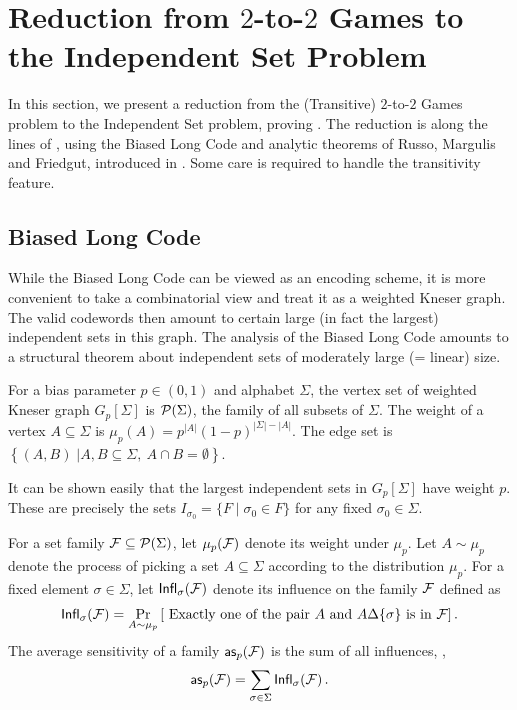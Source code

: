 \documentclass{toc}
\newcommand\card[1]{\left| {#1} \right|}
\newcommand\sett[2]{\left\{ \left. #1 \;\right\vert #2 \right\}}
\newcommand\Prob[2]{{\Pr_{#1}\left[ {#2} \right]}}
\begin{document}
\section{Reduction from \texorpdfstring{$2$-to-$2$}{2-to-2} Games
to the Independent Set Problem}\label{sec:vc-is}

In this section, we present a reduction from the (Transitive) $2$-to-$2$ Games problem to the Independent Set problem, proving
.
The reduction is along the lines of \cite{DS05, Khot02, KR08}, using the Biased Long Code
and analytic theorems of Russo, Margulis and Friedgut, introduced in \cite{DS05}. Some care is required to handle the
transitivity feature.


\subsection{Biased Long Code}\label{appendix:blc}
While the Biased Long Code can be viewed as an encoding scheme, it is more convenient to take a combinatorial
view and treat it as a weighted Kneser graph. The valid codewords then amount to certain large (in fact the largest) independent sets
in this graph. The analysis of the Biased Long Code amounts to a structural theorem about independent sets of
moderately large (= linear) size.


\begin{definition} For a bias parameter $p \in (0, 1)$ and alphabet $\Sigma$,
the vertex set of weighted Kneser graph  $G_p[\Sigma]$ is ${\cal P}(\Sigma)$, the family of all subsets of $\Sigma$.
The weight of a vertex $A \subseteq \Sigma$ is $\mu_p(A)=p^{\card{A}}(1-p)^{|\Sigma|-\card{A}}$.
The edge set is $\sett{(A,B)}{A, B \subseteq\Sigma, ~A\cap B=\emptyset}$.
\end{definition}

It can be shown easily that the largest independent sets in $G_p[\Sigma]$ have weight $p$. These are precisely
the sets $I_{\sigma_0} = \{ F \mid \sigma_0 \in F \}$ for any fixed $\sigma_0 \in \Sigma$.

\begin{definition} For a set family ${\cal F} \subseteq {\cal P}(\Sigma)$, let $\mu_p({\cal F})$ denote its
weight under $\mu_p$. Let $A \sim \mu_p$ denote the process of picking a set $A \subseteq \Sigma$
according to the distribution $\mu_p$.
For a fixed element $\sigma \in \Sigma$, let ${\sf Infl}_\sigma({\cal F})$ denote its
influence on the family ${\cal F}$ defined as
 $$ {\sf Infl}_\sigma({\cal F})  =  \Prob{A \sim \mu_p}{\mbox{~Exactly one of the pair} ~A ~\mbox{and}  ~A \Delta \{\sigma\} ~\mbox{is in} ~{\cal F}}\,. $$%
 The average sensitivity of a family ${\sf as}_p({\cal F})$ is the sum of all influences, \ie,
 $${\sf as}_p({\cal F}) = \sum_{\sigma \in \Sigma}  {\sf Infl}_\sigma({\cal F})\,.   $$%
\end{definition}
\end{document}
